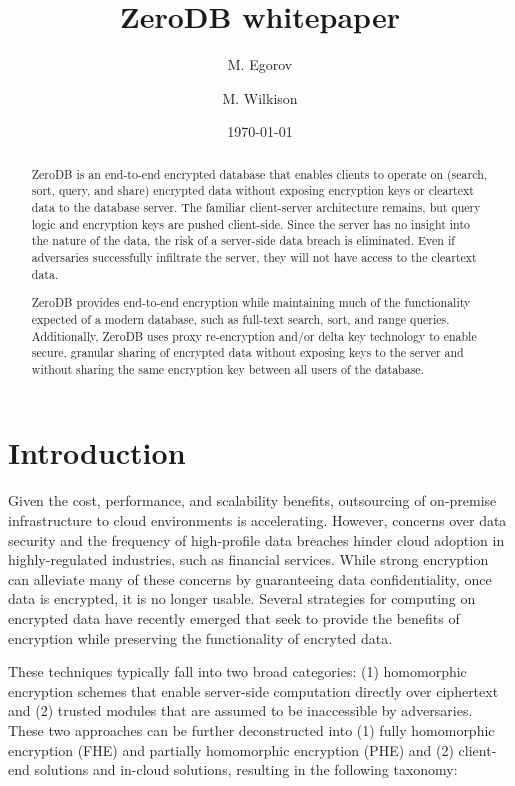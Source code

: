 \documentclass[notitlepage]{revtex4-1}
\begin{document}
\title{ZeroDB whitepaper}

\author{M. Egorov}
\author{M. Wilkison}

\begin{abstract}
ZeroDB is an end-to-end encrypted database that enables clients to operate on (search, sort, query, and share) encrypted data without exposing encryption keys or cleartext data to the database server.
The familiar client-server architecture remains, but query logic and encryption keys are pushed client-side.
Since the server has no insight into the nature of the data, the risk of a server-side data breach is eliminated.
Even if adversaries successfully infiltrate the server, they will not have access to the cleartext data.

ZeroDB provides end-to-end encryption while maintaining much of the functionality expected of a modern database, such as full-text search, sort, and range queries.
Additionally, ZeroDB uses proxy re-encryption and/or delta key technology to enable secure, granular sharing of encrypted data without exposing keys to the server and without sharing the same encryption key between all users of the database.
\end{abstract}

\date{\today}
\maketitle

\section{Introduction}

Given the cost, performance, and scalability benefits, outsourcing of on-premise infrastructure to cloud environments is accelerating.
However, concerns over data security and the frequency of high-profile data breaches hinder cloud adoption in highly-regulated industries, such as financial services.
While strong encryption can alleviate many of these concerns by guaranteeing data confidentiality, once data is encrypted, it is no longer usable.
Several strategies for computing on encrypted data have recently emerged that seek to provide the benefits of encryption while preserving the functionality of encryted data.

These techniques typically fall into two broad categories: (1) homomorphic encryption schemes that enable server-side computation directly over ciphertext and (2) trusted modules that are assumed to be inaccessible by adversaries\cite{tutorial}. These two approaches can be further deconstructed into (1) fully homomorphic encryption (FHE) and partially homomorphic encryption (PHE) and (2) client-end solutions and in-cloud solutions, resulting in the following taxonomy:
\end{document}
